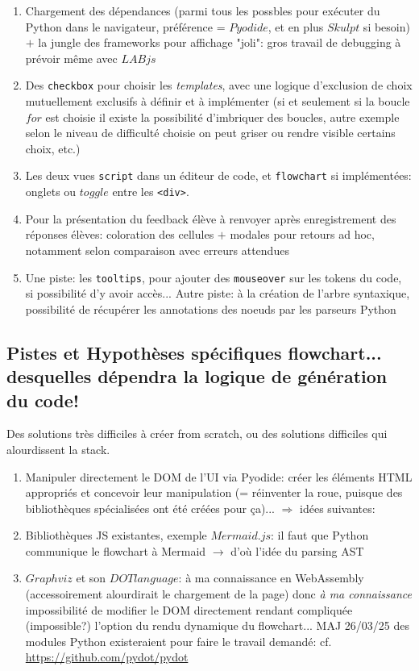 \documentclass[11pt,a4paper]{article}
\begin{document}
\begin{enumerate}
    \item Chargement des dépendances (parmi tous les possbles pour exécuter du Python dans le navigateur, préférence = $Pyodide$, et en plus $Skulpt$ si besoin) $+$ la jungle des frameworks pour affichage "joli": gros travail de debugging à prévoir même avec $LABjs$
    
    \item Des \texttt{checkbox} pour choisir les \textit{templates}, avec une logique d'exclusion de choix mutuellement exclusifs à définir et à implémenter (si et seulement si la boucle $for$ est choisie il existe la possibilité d'imbriquer des boucles, autre exemple selon le niveau de difficulté choisie on peut griser ou rendre visible certains choix, etc.)
    
    \item Les deux vues  \texttt{script} dans un éditeur de code, et \texttt{flowchart} si implémentées: onglets ou $toggle$ entre les \texttt{<div>}.
    
    \item Pour la présentation du feedback élève à renvoyer après enregistrement des réponses élèves: coloration des cellules $+$ modales pour retours ad hoc, notamment selon comparaison avec erreurs attendues
    
    \item Une piste: les \texttt{tooltips}, pour ajouter des \texttt{mouseover} sur les tokens du code, si possibilité d'y avoir accès... Autre piste: à la création de l'arbre syntaxique, possibilité de récupérer les annotations des noeuds par les parseurs Python
\end{enumerate}

\subsection*{Pistes et Hypothèses spécifiques flowchart... desquelles dépendra la logique de génération du code!}

Des solutions très difficiles à créer from scratch, ou des solutions difficiles qui alourdissent la stack.

\begin{enumerate}
    \item Manipuler directement le DOM de l'UI via Pyodide: créer les éléments HTML appropriés et concevoir leur manipulation (= réinventer la roue, puisque des bibliothèques spécialisées ont été créées pour ça)... $\Rightarrow$ idées suivantes:
    \item Bibliothèques JS existantes, exemple $Mermaid.js$: il faut que Python communique le flowchart à Mermaid $\rightarrow$ d'où l'idée du parsing AST
    \item $Graphviz$ et son $DOT language$: à ma connaissance en WebAssembly (accessoirement alourdirait le chargement de la page) donc \textit{à ma connaissance} impossibilité de modifier le DOM directement rendant compliquée (impossible?) l'option du rendu dynamique du flowchart... MAJ 26/03/25 des modules Python existeraient pour faire le travail demandé: cf. \url{https://github.com/pydot/pydot}
\end{enumerate}
\end{document}
